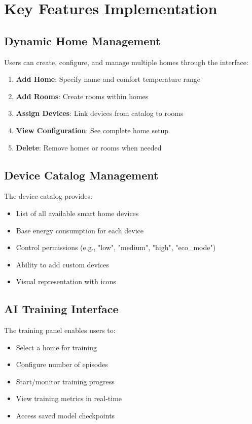 \documentclass[12pt,a4paper]{article}
\begin{document}
\section{Key Features Implementation}

\subsection{Dynamic Home Management}

Users can create, configure, and manage multiple homes through the interface:

\begin{enumerate}[leftmargin=*]
    \item \textbf{Add Home}: Specify name and comfort temperature range
    \item \textbf{Add Rooms}: Create rooms within homes
    \item \textbf{Assign Devices}: Link devices from catalog to rooms
    \item \textbf{View Configuration}: See complete home setup
    \item \textbf{Delete}: Remove homes or rooms when needed
\end{enumerate}

\subsection{Device Catalog Management}

The device catalog provides:
\begin{itemize}[leftmargin=*]
    \item List of all available smart home devices
    \item Base energy consumption for each device
    \item Control permissions (e.g., "low", "medium", "high", "eco\_mode")
    \item Ability to add custom devices
    \item Visual representation with icons
\end{itemize}

\subsection{AI Training Interface}

The training panel enables users to:
\begin{itemize}[leftmargin=*]
    \item Select a home for training
    \item Configure number of episodes
    \item Start/monitor training progress
    \item View training metrics in real-time
    \item Access saved model checkpoints
\end{itemize}
\end{document}
